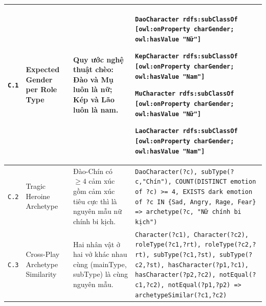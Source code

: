 \begin{longtable}{|p{0.9cm}|p{3.0cm}|p{4.0cm}|p{6.4cm}|}
  \texttt{C.1}
  & Expected Gender per Role Type
  & Quy ước nghệ thuật chèo: Đào và Mụ luôn là nữ; Kép và Lão luôn là nam.
  & \texttt{DaoCharacter rdfs:subClassOf
    [owl:onProperty charGender; owl:hasValue "Nữ"]}\par
    \texttt{KepCharacter rdfs:subClassOf
    [owl:onProperty charGender; owl:hasValue "Nam"]}\par
    \texttt{MuCharacter rdfs:subClassOf
    [owl:onProperty charGender; owl:hasValue "Nữ"]}\par
    \texttt{LaoCharacter rdfs:subClassOf
    [owl:onProperty charGender; owl:hasValue "Nam"]} \\
  \hline

  \texttt{C.2}
  & Tragic Heroine Archetype
  & Đào-Chín có $\geq 4$ cảm xúc gồm cảm xúc tiêu cực thì là nguyên mẫu nữ chính bi kịch.
  & \texttt{DaoCharacter(?c), subType(?c,"Chín"),
    COUNT(DISTINCT emotion of ?c) >= 4,
    EXISTS dark emotion of ?c IN \{Sad, Angry, Rage, Fear\}
    => archetype(?c, "Nữ chính bi kịch")}\par \\
  \hline

  \texttt{C.3}
  & Cross-Play Archetype Similarity
  & Hai nhân vật ở hai vở khác nhau cùng (mainType, subType) là cùng nguyên mẫu.
  & \texttt{Character(?c1), Character(?c2),
    roleType(?c1,?rt), roleType(?c2,?rt),
    subType(?c1,?st), subType(?c2,?st),
    hasCharacter(?p1,?c1), hasCharacter(?p2,?c2),
    notEqual(?c1,?c2), notEqual(?p1,?p2)
    => archetypeSimilar(?c1,?c2)} \\
  \hline

\end{longtable}
